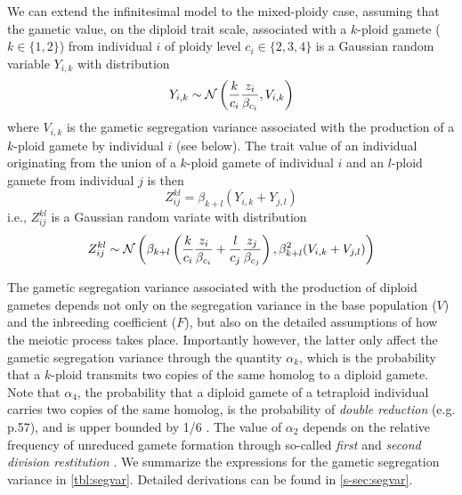 \documentclass[12pt,a4paper]{article}
\begin{document}
We can extend the infinitesimal model to the mixed-ploidy case, assuming that the
gametic value, on the diploid trait scale, associated with a $k$-ploid gamete ($k
\in \{1,2\}$) from individual $i$ of ploidy level $c_i \in \{2,3,4\}$ is a
Gaussian random variable $Y_{i,k}$ with distribution
\begin{equation}
    Y_{i,k} \sim \mathcal{N}\left(\frac{k}{c_i}\frac{z_i}{\beta_{c_i}}, V_{i,k}\right)
    \label{eq:gamete}
\end{equation}
where $V_{i,k}$ is the gametic segregation variance associated with the
production of a $k$-ploid gamete by individual $i$ (see below).
The trait value of an individual originating from the union of a $k$-ploid
gamete of individual $i$ and an $l$-ploid gamete from individual $j$ is then
  $$Z_{ij}^{kl} = \beta_{k+l}\left(Y_{i,k} + Y_{j,l}\right)$$
i.e., $Z_{ij}^{kl}$ is a Gaussian random variate with distribution
\begin{equation}
  Z_{ij}^{kl} \sim \mathcal{N}\left(
    \beta_{k+l} \left(
          \frac{k}{c_i}\frac{z_i}{\beta_{c_i}} 
        + \frac{l}{c_j}\frac{z_j}{\beta_{c_j}}\right), 
    \beta_{k+l}^2 (V_{i,k} + V_{j,l})\right)
   \label{eq:oneline}
\end{equation}

The gametic segregation variance associated with the production of diploid
gametes depends not only on the segregation variance in the base population
($V$) and the inbreeding coefficient ($F$), but also on the detailed
assumptions of how the meiotic process takes place.
Importantly however, the latter only affect the gametic segregation variance
through the quantity $\alpha_k$, which is the probability that a $k$-ploid
transmits two copies of the same homolog to a diploid gamete.
Note that $\alpha_4$, the probability that a diploid gamete of a tetraploid
individual carries two copies of the same homolog, is the probability of
\textit{double reduction} (e.g. \cite{lynch1998} p.57), and is upper bounded by
1/6 \citep{stift2008}.
The value of $\alpha_2$ depends on the relative frequency of unreduced gamete
formation through so-called \textit{first} and \textit{second division
restitution} \citep{bretagnolle1995,storme2013}.
We summarize the expressions for the gametic segregation variance in
\cref{tbl:segvar}.
Detailed derivations can be found in \cref{s-sec:segvar}.
\end{document}
